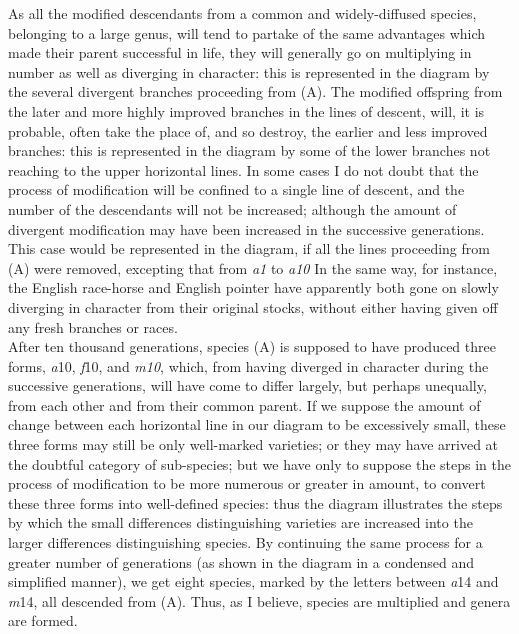 \indent As all the modified descendants from a common and widely-diffused species, belonging to a large genus, will tend to partake of the same advantages which made their parent successful in life, they will generally go on multiplying in number as well as diverging in character: this is represented in the diagram by the several divergent branches proceeding from (A). The modified offspring from the later and more highly improved branches in the lines of descent, will, it is probable, often take the place of, and so destroy, the earlier and less improved branches: this is represented in the diagram by some of the lower branches not reaching to the upper horizontal lines. In some cases I do not doubt that the process of modification will be confined to a single line of descent, and the number of the descendants will not be increased; although the amount of divergent modification may have been increased in the successive generations.  This case would be represented in the diagram, if all the lines proceeding from (A) were removed, excepting that from \emph{a1} to \emph{a10} In the same way, for instance, the English race-horse and English pointer have apparently both gone on slowly diverging in character from their original stocks, without either having given off any fresh branches or races. \\
\indent After ten thousand generations, species (A) is supposed to have produced three forms, \emph{a}10, \emph{f}10, and \emph{m10}, which, from having diverged in character during the successive generations, will have come to differ largely, but perhaps unequally, from each other and from their common parent.  If we suppose the amount of change between each horizontal line in our diagram to be excessively small, these three forms may still be only well-marked varieties; or they may have arrived at the doubtful category of sub-species; but we have only to suppose the steps in the process of modification to be more numerous or greater in amount, to convert these three forms into well-defined species: thus the diagram illustrates the steps by which the small differences distinguishing varieties are increased into the larger differences distinguishing species.  By continuing the same process for a greater number of generations (as shown in the diagram in a condensed and simplified manner), we get eight species, marked by the letters between \emph{a}14 and \emph{m}14, all descended from (A). Thus, as I believe, species are multiplied and genera are formed. \\
